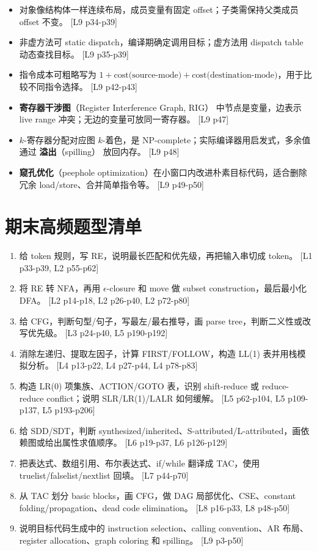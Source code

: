 \documentclass[UTF8,fontset=none,11pt]{ctexart}
\newcommand{\pg}[1]{{\scriptsize\textcolor{citegray}{[#1]}}}
\newcommand{\term}[2]{\textbf{#1}（#2）}
\begin{document}
\begin{itemize}
  \item 对象像结构体一样连续布局，成员变量有固定 offset；子类需保持父类成员 offset 不变。 \pg{L9 p34-p39}
  \item 非虚方法可 static dispatch，编译期确定调用目标；虚方法用 dispatch table 动态查找目标。 \pg{L9 p35-p39}
  \item 指令成本可粗略写为 \(1+\text{cost(source-mode)}+\text{cost(destination-mode)}\)，用于比较不同指令选择。 \pg{L9 p42-p43}
  \item \term{寄存器干涉图}{Register Interference Graph, RIG} 中节点是变量，边表示 live range 冲突；无边的变量可放同一寄存器。 \pg{L9 p47}
  \item \(k\)-寄存器分配对应图 \(k\)-着色，是 NP-complete；实际编译器用启发式，多余值通过 \term{溢出}{spilling} 放回内存。 \pg{L9 p48}
  \item \term{窥孔优化}{peephole optimization}在小窗口内改进朴素目标代码，适合删除冗余 load/store、合并简单指令等。 \pg{L9 p49-p50}
\end{itemize}

\section{期末高频题型清单}

\begin{enumerate}
  \item 给 token 规则，写 RE，说明最长匹配和优先级，再把输入串切成 token。 \pg{L1 p33-p39, L2 p55-p62}
  \item 将 RE 转 NFA，再用 \(\epsilon\)-closure 和 move 做 subset construction，最后最小化 DFA。 \pg{L2 p14-p18, L2 p26-p40, L2 p72-p80}
  \item 给 CFG，判断句型/句子，写最左/最右推导，画 parse tree，判断二义性或改写优先级。 \pg{L3 p24-p40, L5 p190-p192}
  \item 消除左递归、提取左因子，计算 FIRST/FOLLOW，构造 LL(1) 表并用栈模拟分析。 \pg{L4 p13-p22, L4 p27-p44, L4 p78-p83}
  \item 构造 LR(0) 项集族、ACTION/GOTO 表，识别 shift-reduce 或 reduce-reduce conflict；说明 SLR/LR(1)/LALR 如何缓解。 \pg{L5 p62-p104, L5 p109-p137, L5 p193-p206}
  \item 给 SDD/SDT，判断 synthesized/inherited、S-attributed/L-attributed，画依赖图或给出属性求值顺序。 \pg{L6 p19-p37, L6 p126-p129}
  \item 把表达式、数组引用、布尔表达式、if/while 翻译成 TAC，使用 truelist/falselist/nextlist 回填。 \pg{L7 p44-p70}
  \item 从 TAC 划分 basic blocks，画 CFG，做 DAG 局部优化、CSE、constant folding/propagation、dead code elimination。 \pg{L8 p16-p33, L8 p48-p50}
  \item 说明目标代码生成中的 instruction selection、calling convention、AR 布局、register allocation、graph coloring 和 spilling。 \pg{L9 p3-p50}
\end{enumerate}
\end{document}
